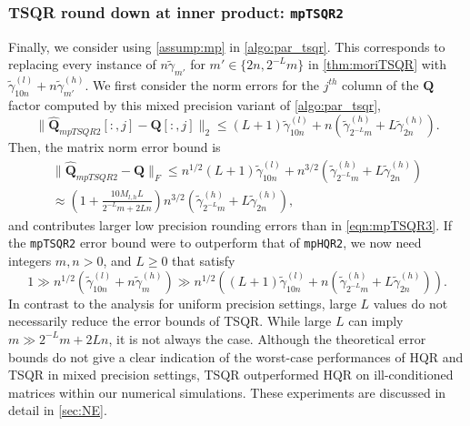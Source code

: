 \documentclass[review,onefignum,onetabnum]{siamart190516}
\newcommand{\bb}[1]{\mathbf{#1}}
\begin{document}
\subsubsection{TSQR round down at inner product: {\tt mpTSQR2}}
Finally, we consider using \cref{assump:mp} in \cref{algo:par_tsqr}.
This corresponds to replacing every instance of $n\tilde{\gamma}_{m'}$ for $m'\in\{2n, 2^{-L}m\}$ in \cref{thm:moriTSQR} with $\tilde{\gamma}_{10n}^{(l)} + n\tilde{\gamma}_{m'}^{(h)}$.
We first consider the norm errors for the $j^{th}$ column of the $\bb{Q}$ factor computed by this mixed precision variant of \cref{algo:par_tsqr},
\begin{equation}
\|\hat{\bb{Q}}_{mpTSQR2}[:,j] -\bb{Q}[:,j]\|_2 \leq (L+1)\tilde{\gamma}_{10n}^{(l)} +n(\tilde{\gamma}_{2^{-L}m}^{(h)} + L\tilde{\gamma}_{ 2n}^{(h)}).\label{eqn:mptsqr2Qcol}
\end{equation} 
Then, the matrix norm error bound is 
\begin{align}
\|\hat{\bb{Q}}_{mpTSQR2}-\bb{Q}\|_F \leq n^{1/2}(L+1)\tilde{\gamma}_{10n}^{(l)} +n^{3/2}(\tilde{\gamma}_{2^{-L}m}^{(h)} + L\tilde{\gamma}_{ 2n}^{(h)})\\
\approx \left(1+ \frac{10M_{l,h}L}{2^{-L}m+ 2Ln}\right)n^{3/2}(\tilde{\gamma}_{2^{-L}m}^{(h)} + L\tilde{\gamma}_{ 2n}^{(h)}),\label{eqn:mptsqr2Q}
\end{align}
and contributes larger low precision rounding errors than in \cref{eqn:mpTSQR3}.
If the {\tt mpTSQR2} error bound were to outperform that of {\tt mpHQR2}, we now need integers $m, n > 0$, and $L\geq 0$ that satisfy
\begin{equation*}
1\gg n^{1/2}\left(\tilde{\gamma}_{10n}^{(l)} + n\tilde{\gamma}_{m}^{(h)}\right) \gg n^{1/2}\left((L+1)\tilde{\gamma}_{10n}^{(l)} +n(\tilde{\gamma}_{2^{-L}m}^{(h)} + L\tilde{\gamma}_{ 2n}^{(h)})\right).%
\end{equation*}
In contrast to the analysis for uniform precision settings, large $L$ values do not necessarily reduce the error bounds of TSQR. 
While large $L$ can imply $m\gg 2^{-L}m+2Ln$, it is not always the case.
Although the theoretical error bounds do not give a clear indication of the worst-case performances of HQR and TSQR in mixed precision settings, TSQR outperformed HQR on ill-conditioned matrices within our numerical simulations.
These experiments are discussed in detail in \cref{sec:NE}.
%
\end{document}
